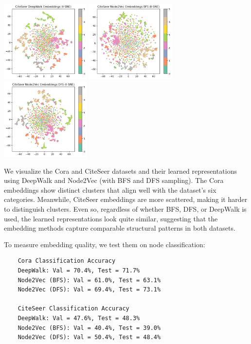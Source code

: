 \documentclass[11pt]{scrartcl}
\begin{document}
\begin{center}
    \includegraphics[width=4.5cm]{hw1-img/hw1-p5-6.png}
    \includegraphics[width=4.5cm]{hw1-img/hw1-p5-7.png}
    \includegraphics[width=4.5cm]{hw1-img/hw1-p5-8.png}
\end{center}

We visualize the Cora and CiteSeer datasets and their learned representations using DeepWalk and Node2Vec (with BFS and DFS sampling). The Cora embeddings show distinct clusters that align well with the dataset's six categories. Meanwhile, CiteSeer embeddings are more scattered, making it harder to distinguish clusters. Even so, regardless of whether BFS, DFS, or DeepWalk is used, the learned representations look quite similar, suggesting that the embedding methods capture comparable structural patterns in both datasets.

To measure embedding quality, we test them on node classification:

\begin{verbatim}
    Cora Classification Accuracy
    DeepWalk: Val = 70.4%, Test = 71.7%
    Node2Vec (BFS): Val = 61.0%, Test = 63.1%
    Node2Vec (DFS): Val = 69.4%, Test = 73.1%

    CiteSeer Classification Accuracy
    DeepWalk: Val = 47.6%, Test = 48.3%
    Node2Vec (BFS): Val = 40.4%, Test = 39.0%
    Node2Vec (DFS): Val = 50.4%, Test = 48.4%
\end{verbatim}
\end{document}
